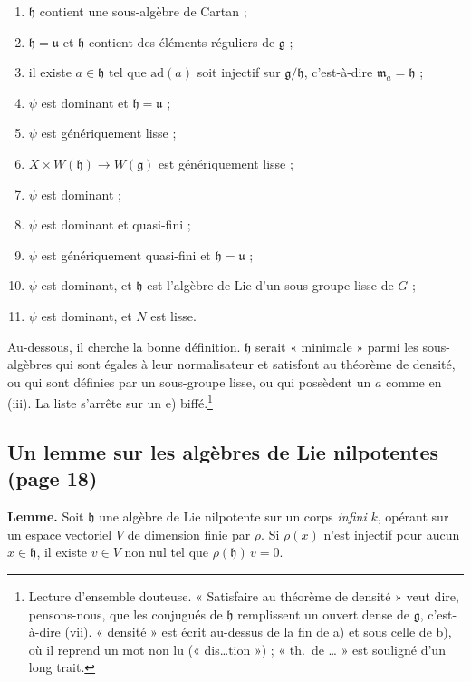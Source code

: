 \documentclass[11pt,a4paper]{article}
\begin{document}
\begin{enumerate}
\item[(i)] $\mathfrak{h}$ contient une sous-algèbre de Cartan ;
\item[(ii)] $\mathfrak{h} = \mathfrak{u}$ et $\mathfrak{h}$ contient des
éléments réguliers de $\mathfrak{g}$ ;
\item[(iii)] il existe $a \in \mathfrak{h}$ tel que $\mathrm{ad}(a)$ soit
injectif sur $\mathfrak{g}/\mathfrak{h}$, c'est-à-dire
$\mathfrak{m}_{a} = \mathfrak{h}$ ;
\item[(iv)] $\psi$ est dominant et $\mathfrak{h} = \mathfrak{u}$ ;
\item[(v)] $\psi$ est génériquement lisse ;
\item[(vi)] $X \times W(\mathfrak{h}) \to W(\mathfrak{g})$ est génériquement
lisse ;
\item[(vii)] $\psi$ est dominant ;
\item[(viii)] $\psi$ est dominant et quasi-fini ;
\item[(ix)] $\psi$ est génériquement quasi-fini et $\mathfrak{h} =
\mathfrak{u}$ ;
\item[(x)] $\psi$ est dominant, et $\mathfrak{h}$ est l'algèbre de Lie d'un
sous-groupe lisse de $G$ ;
\item[(xi)] $\psi$ est dominant, et $N$ est lisse.
\end{enumerate}

Au-dessous, il cherche la bonne définition. $\mathfrak{h}$ serait
« minimale » parmi les sous-algèbres qui sont égales à leur normalisateur et
satisfont au théorème de densité, ou qui sont définies par un sous-groupe
lisse, ou qui possèdent un $a$ comme en (iii). La liste s'arrête sur un e)
biffé.\footnote{Lecture d'ensemble douteuse. « Satisfaire au théorème de
densité » veut dire, pensons-nous, que les conjugués de $\mathfrak{h}$
remplissent un ouvert dense de $\mathfrak{g}$, c'est-à-dire (vii). « densité »
est écrit au-dessus de la fin de a) et sous celle de b), où il reprend un mot
non lu (« dis…tion ») ; « th.\ de … » est souligné d'un long trait.}

\subsection*{Un lemme sur les algèbres de Lie nilpotentes (page 18)}

\textbf{Lemme.} Soit $\mathfrak{h}$ une algèbre de Lie nilpotente sur un corps
\emph{infini} $k$, opérant sur un espace vectoriel $V$ de dimension finie par
$\rho$. Si $\rho(x)$ n'est injectif pour aucun $x \in \mathfrak{h}$, il existe
$v \in V$ non nul tel que $\rho(\mathfrak{h})\, v = 0$.
\end{document}

